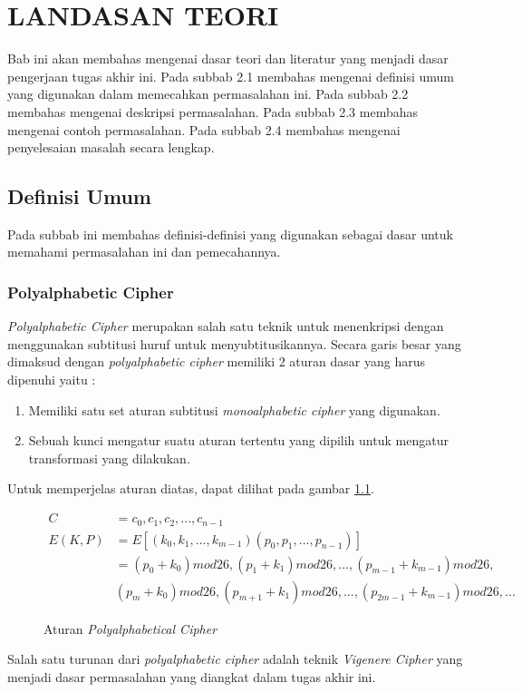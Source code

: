
	\chapter{LANDASAN TEORI}
	Bab ini akan membahas mengenai dasar teori dan literatur yang menjadi dasar pengerjaan tugas akhir ini. Pada subbab 2.1 membahas mengenai definisi umum yang digunakan dalam memecahkan permasalahan ini. Pada subbab 2.2 membahas mengenai deskripsi permasalahan. Pada subbab 2.3 membahas mengenai contoh permasalahan. Pada subbab 2.4 membahas mengenai penyelesaian masalah secara lengkap.
	\section{Definisi Umum}
	Pada subbab ini membahas definisi-definisi yang digunakan sebagai dasar untuk memahami permasalahan ini dan pemecahannya.	
	\subsection{Polyalphabetic Cipher}
	\textit{Polyalphabetic Cipher }merupakan salah satu teknik untuk menenkripsi dengan menggunakan subtitusi huruf untuk menyubtitusikannya. Secara garis besar yang dimaksud dengan \textit{polyalphabetic cipher} memiliki 2 aturan dasar yang harus dipenuhi yaitu :
	\begin{enumerate}
		\item Memiliki satu set aturan subtitusi \textit{monoalphabetic cipher} yang digunakan.
		\item Sebuah kunci mengatur suatu aturan tertentu yang dipilih untuk mengatur transformasi yang dilakukan.
	\end{enumerate}
	Untuk memperjelas aturan diatas, dapat dilihat pada gambar \ref{fig:polyalphabeticalcipher}.
	\begin{figure}[H]
		\centering
		\begin{align*}
 		C &=c_0,c_1,c_2,...,c_{n-1} \\
      	E(K,P)&=E[(k_0,k_1,...,k_{m-1})(p_0,p_1,...,p_{n-1})] \\
      	&=(p_0+k_0)mod26,(p_1+k_1)mod26,...,(p_{m-1}+k_{m-1})mod26, \\
      		&(p_m+k_0)mod26,(p_{m+1}+k_1)mod26,...,(p_{2m-1}+k_{m-1})mod26,...
		\end{align*}		
		
		\caption{Aturan \textit{Polyalphabetical Cipher}}
		\label{fig:polyalphabeticalcipher}
	\end{figure}
	Salah satu turunan dari \textit{polyalphabetic cipher} adalah teknik \textit{Vigenere Cipher} yang menjadi dasar permasalahan yang diangkat dalam tugas akhir ini.\cite{stallings_computer_2015}
	
